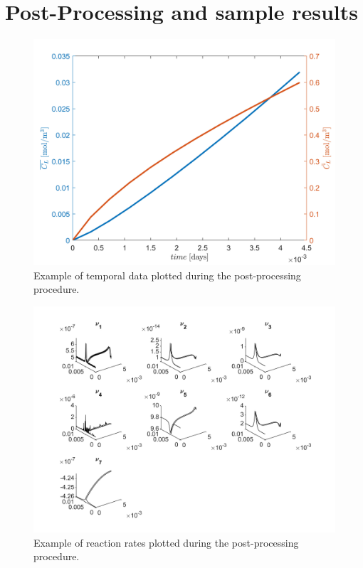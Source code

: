 \documentclass[3p]{elsarticle} %
\begin{document}
\section{Post-Processing and sample results}
\begin{figure}
    \centering
    \includegraphics[width=12cm]{../Figures/HydrogenOverTime.jpg}
    \caption{Example of temporal data plotted during the post-processing procedure.}
    \label{fig:example_timedep}
\end{figure}
\begin{figure}
    \centering
    \includegraphics[width=12cm]{../Figures/ReactionRates.jpg}
    \caption{Example of reaction rates plotted during the post-processing procedure.}
    \label{fig:example_rates}
\end{figure}
\end{document}
